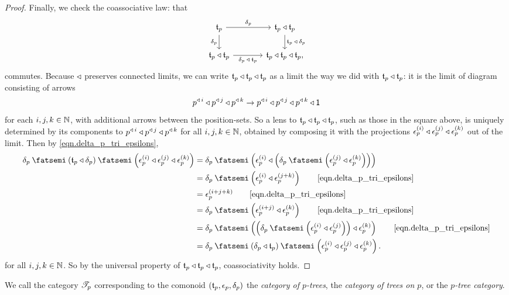 \documentclass[Book-Poly]{subfiles}
\begin{document}
\begin{proof}
Finally, we check the coassociative law: that
\[
\begin{tikzcd}[column sep=large]
	\car{t}_p\ar[r, "\delta_p"]\ar[d, "\delta_p"']&
	\car{t}_p\tri\car{t}_p\ar[d, "\car{t}_p\:\tri\:\delta_p"]\\
	\car{t}_p\tri\car{t}_p\ar[r, "\delta_p\:\tri\:\car{t}_p"']&
	\car{t}_p\tri\car{t}_p\tri\car{t}_p,
\end{tikzcd}
\]
commutes.
Because $\mathbin{\triangleleft}$ preserves connected limits, we can write $\mathfrak{t}_p\mathbin{\triangleleft}\mathfrak{t}_p\mathbin{\triangleleft}\mathfrak{t}_p$ as a limit the way we did with $\mathfrak{t}_p\mathbin{\triangleleft}\mathfrak{t}_p$: it is the limit of diagram consisting of arrows
\[
    p^{\mathbin{\triangleleft}\,i}\mathbin{\triangleleft} p^{\mathbin{\triangleleft}\,j}\mathbin{\triangleleft} p^{\mathbin{\triangleleft}\,k}\to p^{\mathbin{\triangleleft}\,i}\mathbin{\triangleleft} p^{\mathbin{\triangleleft}\,j}\mathbin{\triangleleft} p^{\mathbin{\triangleleft}\,k}\mathbin{\triangleleft}\textsf{1}
\]
for each $i,j,k\in\mathbb{N}$, with additional arrows between the position-sets.
So a lens to $\mathfrak{t}_p\mathbin{\triangleleft}\mathfrak{t}_p\mathbin{\triangleleft}\mathfrak{t}_p$, such as those in the square above, is uniquely determined by its components to $p^{\mathbin{\triangleleft}\,i}\mathbin{\triangleleft} p^{\mathbin{\triangleleft}\,j}\mathbin{\triangleleft} p^{\mathbin{\triangleleft}\,k}$ for all $i,j,k\in\mathbb{N}$, obtained by composing it with the projections $\epsilon^{(i)}_p\mathbin{\triangleleft}\epsilon^{(j)}_p\mathbin{\triangleleft}\epsilon^{(k)}_p$ out of the limit.
Then by \eqref{eqn.delta_p_tri_epsilons},
\begin{align*}
    \delta_p\then\left(\car{t}_p\tri\delta_p\right)\then\left(\epsilon^{(i)}_p\tri\epsilon^{(j)}_p\tri\epsilon^{(k)}_p\right) &=
    \delta_p\then\left(\epsilon^{(i)}_p\tri\left(\delta_p\then\left(\epsilon^{(j)}_p\tri\epsilon^{(k)}_p\right)\right)\right) \\ &=
    \delta_p\then\left(\epsilon^{(i)}_p\tri\epsilon^{(j+k)}_p\right) \tag*{\eqref{eqn.delta_p_tri_epsilons}} \\ &=
    \epsilon^{(i+j+k)}_p \tag*{\eqref{eqn.delta_p_tri_epsilons}} \\ &=
    \delta_p\then\left(\epsilon^{(i+j)}_p\tri\epsilon^{(k)}_p\right) \tag*{\eqref{eqn.delta_p_tri_epsilons}} \\ &=
    \delta_p\then\left(\left(\delta_p\then\left(\epsilon^{(i)}_p\tri\epsilon^{(j)}_p\right)\right)\tri\epsilon^{(k)}_p\right) \tag*{\eqref{eqn.delta_p_tri_epsilons}} \\ &=
    \delta_p\then\left(\delta_p\tri\car{t}_p\right)\then\left(\epsilon^{(i)}_p\tri\epsilon^{(j)}_p\tri\epsilon^{(k)}_p\right).
\end{align*}
for all $i,j,k\in\mathbb{N}$.
So by the universal property of $\mathfrak{t}_p\mathbin{\triangleleft}\mathfrak{t}_p\mathbin{\triangleleft}\mathfrak{t}_p$, coassociativity holds.
\end{proof}

We call the category $\mathscr{T}_{p}$ corresponding to the comonoid $\left(\mathfrak{t}_p,\epsilon_p,\delta_p\right)$ the \emph{category of $p$-trees}, the \emph{category of trees on $p$}, or the \emph{$p$-tree category}.
\end{document}
